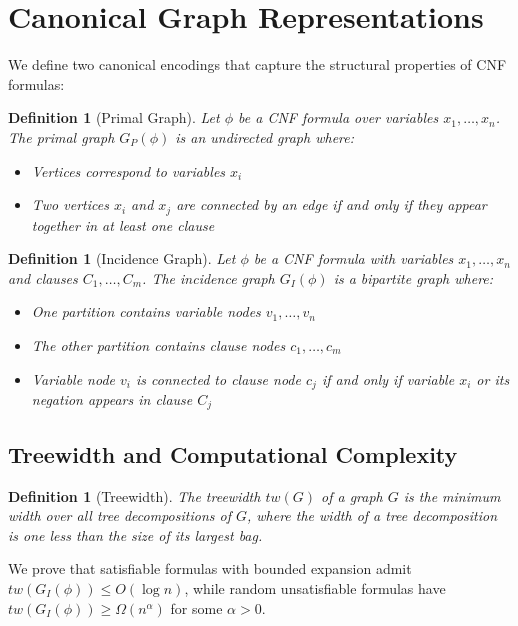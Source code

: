 \documentclass[11pt]{article}
\newtheorem{definition}[theorem]{Definition}
\begin{document}
\section{Canonical Graph Representations}

We define two canonical encodings that capture the structural properties of CNF formulas:

\begin{definition}[Primal Graph]
Let $\phi$ be a CNF formula over variables $x_1, \ldots, x_n$. The \emph{primal graph} $G_P(\phi)$ is an undirected graph where:
\begin{itemize}
\item Vertices correspond to variables $x_i$
\item Two vertices $x_i$ and $x_j$ are connected by an edge if and only if they appear together in at least one clause
\end{itemize}
\end{definition}

\begin{definition}[Incidence Graph]
Let $\phi$ be a CNF formula with variables $x_1, \ldots, x_n$ and clauses $C_1, \ldots, C_m$. The \emph{incidence graph} $G_I(\phi)$ is a bipartite graph where:
\begin{itemize}
\item One partition contains variable nodes $v_1, \ldots, v_n$
\item The other partition contains clause nodes $c_1, \ldots, c_m$
\item Variable node $v_i$ is connected to clause node $c_j$ if and only if variable $x_i$ or its negation appears in clause $C_j$
\end{itemize}
\end{definition}

\subsection{Treewidth and Computational Complexity}

\begin{definition}[Treewidth]
The \emph{treewidth} $tw(G)$ of a graph $G$ is the minimum width over all tree decompositions of $G$, where the width of a tree decomposition is one less than the size of its largest bag.
\end{definition}

We prove that satisfiable formulas with bounded expansion admit $tw(G_I(\phi)) \leq O(\log n)$, while random unsatisfiable formulas have $tw(G_I(\phi)) \geq \Omega(n^{\alpha})$ for some $\alpha > 0$.
\end{document}
